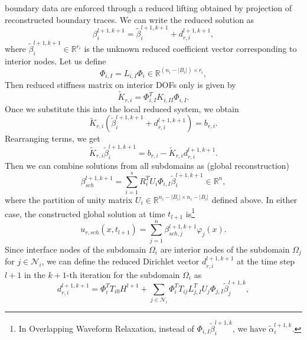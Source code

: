 \documentclass[a4paper, 11pt]{article}
\theoremstyle{plain}
\theoremstyle{definition}
\theoremstyle{remark}
\begin{document}
boundary data are enforced through a reduced lifting obtained by projection of reconstructed
boundary traces. We can write the reduced solution as
\begin{equation*}
    \beta_{i}^{l+1, k+1} = \tilde{\beta}_{i}^{l+1, k+1} + d^{l+1, k+1}_{r, i},
\end{equation*}
where $\tilde{\beta}_{i}^{l+1, k+1}\in \mathbb{R}^{r_{i}}$ is the unknown reduced coefficient 
vector corresponding to interior nodes. Let us define
\begin{equation*}
    \Phi_{i, I} = L_{i, I}\Phi_{i}\in \mathbb{R}^{(n_{i} - \lvert B_{i}\rvert) \times r_{i}},
\end{equation*}
Then reduced stiffness matrix on interior DOFs only is given by
\begin{equation*}
    \tilde{K}_{r, i} = \Phi_{i, I}^{T}K_{i, II}\Phi_{i, I}.
\end{equation*}
Once we substitute this into the local reduced system, we obtain
\begin{equation*}
    \tilde{K}_{r, i}\left(\tilde{\beta}_{i}^{l+1, k+1} + d^{l+1, k+1}_{r, i}\right) = b_{r, i}.
\end{equation*}
Rearranging terms, we get
\begin{equation*}
    \tilde{K}_{r, i}\tilde{\beta}_{i}^{l+1, k+1} = b_{r, i} - \tilde{K}_{r, i}d^{l+1, k+1}_{r, i}.
\end{equation*}
Then we can combine solutions from all subdomains as (global reconstruction)
\begin{equation*}
    \beta_{sch}^{l+1, k+1} = \sum_{i = 1}^{s}R_{i}^{T}U_{i}\Phi_{i, I}\tilde{\beta}^{l+1, k + 1}_{i}\in \mathbb{R}^{n},
\end{equation*}
where the partition of unity matrix $U_{i}\in \mathbb{R}^{n_{i} - \lvert B_{i}\rvert \times n_{i} - \lvert B_{i}\rvert}$ defined above.
In either case, the constructed global solution at time $t_{l+1}$ is\footnote{In Overlapping Waveform Relaxation, instead of $\Phi_{i, I}\tilde{\beta}^{l+1, k}_{i}$, we have $\tilde{\alpha}_{i}^{l+1, k}$.}
\begin{equation*}
    u_{r, sch}(x, t_{l+1}) = \sum_{j=1}^{n}\beta_{sch, j}^{l+1, k+1}\varphi_{j}(x).
\end{equation*}
Since interface nodes of the subdomain $\Omega_i$ are interior nodes of the subdomain $\Omega_j$ for $j\in\mathcal{N}_{i}$, we can define the 
reduced Dirichlet vector $d^{l+1, k+1}_{r, i}$ at the time step $l+1$ in the $k+1$-th iteration for the subdomain $\Omega_i$ as 
\begin{equation*}
    d^{l+1, k+1}_{r, i} = \Phi_{i}^{T}T_{i0}H^{l+1} + \sum_{j\in\mathcal{N}_{i}}\Phi_{i}^{T}T_{ij}L_{j, I}^{T}U_{j}\Phi_{j, I}\tilde{\beta}^{l+1, k}_{j},
\end{equation*}
\end{document}
